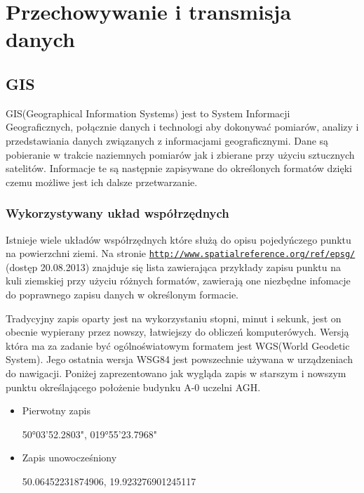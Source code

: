 \clearpage
\newpage
\section{Przechowywanie i transmisja danych}
\label{sec:przesyl}

\subsection{GIS}
\label{subsec:gis}

GIS(Geographical Information Systems) jest to System Informacji Geograficznych, połącznie danych i technologi aby dokonywać pomiarów, analizy i przedstawiania danych związanych z informacjami geograficznymi. Dane są pobieranie w trakcie naziemnych pomiarów jak i zbierane przy użyciu sztucznych satelitów. Informacje te są następnie zapisywane do określonych formatów dzięki czemu możliwe jest ich dalsze przetwarzanie.

\subsubsection{Wykorzystywany układ współrzędnych}
\label{subsec:uklad}

Istnieje wiele układów współrzędnych które służą do opisu pojedyńczego punktu na powierzchni ziemi. Na stronie \underline{\texttt{http://www.spatialreference.org/ref/epsg/}} (dostęp 20.08.2013) znajduje się lista zawierająca przykłady zapisu punktu na kuli ziemskiej przy użyciu różnych formatów, zawierają one niezbędne infomacje do poprawnego zapisu danych w określonym formacie.

Tradycyjny zapis oparty jest na wykorzystaniu stopni, minut i sekunk, jest on obecnie wypierany przez nowszy, łatwiejszy do obliczeń komputerówych. Wersją która ma za zadanie być ogólnoświatowym formatem jest WGS(World Geodetic System). Jego ostatnia wersja  WSG84 jest powszechnie używana w urządzeniach do nawigacji. Poniżej zaprezentowano jak wygląda zapis w starszym i nowszym punktu określającego położenie budynku A-0 uczelni AGH.

\begin{itemize}

\item
Pierwotny zapis

50°03'52.2803", 019°55'23.7968"
\item
Zapis unowocześniony

50.06452231874906, 19.923276901245117
\end{itemize}

